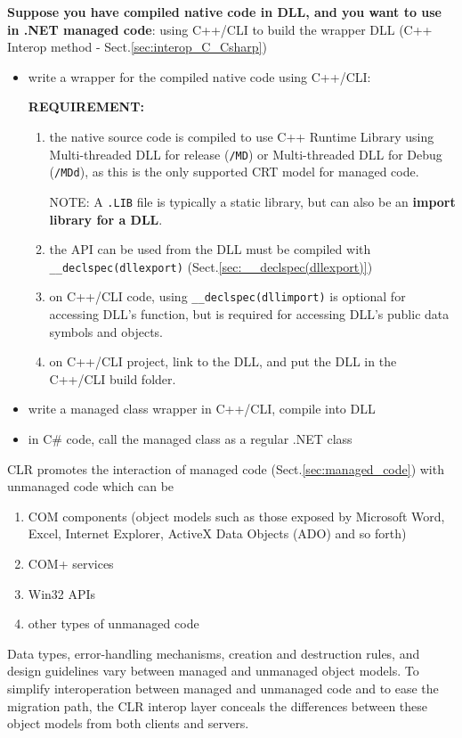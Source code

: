 {\bf Suppose you have compiled native code in DLL, and you want to use in .NET managed code}: using C++/CLI to build the wrapper DLL (C++ Interop method - Sect.\ref{sec:interop_C_Csharp})
\begin{itemize}
  \item write a wrapper for the compiled native code using C++/CLI: 
     
{\bf REQUIREMENT:}
\begin{enumerate}
  \item  the native source code is compiled to use C++ Runtime Library using
Multi-threaded DLL for release (\verb!/MD!) or Multi-threaded DLL for Debug (\verb!/MDd!), as this is the only supported CRT model for managed code. 


NOTE: A \verb!.LIB! file is typically a static library, but can also be an {\bf import library for a DLL}. 


  \item  the API can be used from the DLL must be compiled with
  \verb!__declspec(dllexport)! (Sect.\ref{sec:__declspec(dllexport)})
  
  \item on C++/CLI code, using \verb!__declspec(dllimport)! is optional for accessing DLL's function, but is required for accessing DLL's public data symbols and objects.
  
  \item on C++/CLI project, link to the DLL, and put the DLL in the C++/CLI build folder. 
\end{enumerate}


  \item write a managed class wrapper in C++/CLI, compile into DLL
  \item in C\# code, call the managed class as a regular .NET class
  
\end{itemize}


CLR promotes the interaction of managed code (Sect.\ref{sec:managed_code})
with unmanaged code which can be
\begin{enumerate}
  \item COM components (object models such as those exposed by Microsoft Word,
  Excel, Internet Explorer, ActiveX Data Objects (ADO) and so forth)
  \item COM+ services
  \item Win32 APIs
  \item other types of unmanaged code
\end{enumerate}
Data types, error-handling mechanisms, creation and destruction rules, and
design guidelines vary between managed and unmanaged object models. To simplify
interoperation between managed and unmanaged code and to ease the migration
path, the CLR interop layer conceals the differences between these object models
from both clients and servers.   

